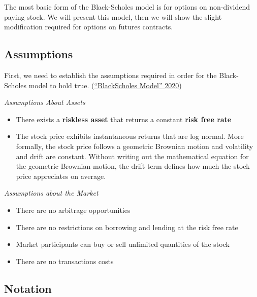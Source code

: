 \documentclass[
]{book}
\begin{document}
The most basic form of the Black-Scholes model is for options on non-dividend paying stock. We will present this model, then we will show the slight modification required for options on futures contracts.

\hypertarget{assumptions}{%
\subsection{Assumptions}\label{assumptions}}

First, we need to establish the assumptions required in order for the Black-Scholes model to hold true. (\protect\hyperlink{ref-blacksc2020}{{``Black{{}}Scholes Model''} 2020})

\emph{Assumptions About Assets}

\begin{itemize}
\item
  There exists a \textbf{riskless asset} that returns a constant \textbf{risk free rate}
\item
  The stock price exhibits instantaneous returns that are log normal. More formally, the stock price follows a geometric Brownian motion and volatility and drift are constant. Without writing out the mathematical equation for the geometric Brownian motion, the drift term defines how much the stock price appreciates on average.
\end{itemize}

\emph{Assumptions about the Market}

\begin{itemize}
\item
  There are no arbitrage opportunities
\item
  There are no restrictions on borrowing and lending at the risk free rate
\item
  Market participants can buy or sell unlimited quantities of the stock
\item
  There are no transactions costs
\end{itemize}

\hypertarget{notation}{%
\subsection{Notation}\label{notation}}
\end{document}
